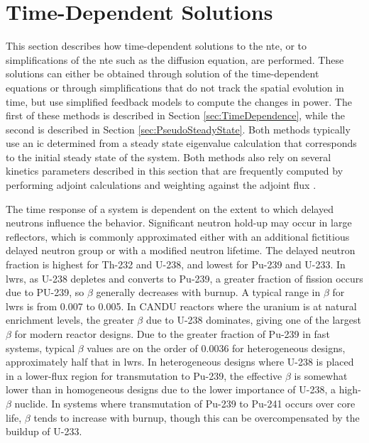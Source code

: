 \section{Time-Dependent Solutions}
\label{sec:Kinetics}

This section describes how time-dependent solutions to the \gls{nte}, or to simplifications of the \gls{nte} such as the diffusion equation, are performed. These solutions can either be obtained through solution of the time-dependent equations or through simplifications that do not track the spatial evolution in time, but use simplified feedback models to compute the changes in power. The first of these methods is described in Section \ref{sec:TimeDependence}, while the second is described in Section \ref{sec:PseudoSteadyState}. Both methods typically use an \gls{ic} determined from a steady state eigenvalue calculation that corresponds to the initial steady state of the system. Both methods also rely on several kinetics parameters described in this section that are frequently computed by performing adjoint calculations and weighting against the adjoint flux \cite{tyobeka}.

The time response of a system is dependent on the extent to which delayed neutrons influence the behavior. Significant neutron hold-up may occur in large reflectors, which is commonly approximated either with an additional fictitious delayed neutron group \cite{xin_wang_thesis} or with a modified neutron lifetime. The delayed neutron fraction is highest for Th-232 and U-238, and lowest for Pu-239 and U-233. In \glspl{lwr}, as U-238 depletes and converts to Pu-239, a greater fraction of fission occurs due to PU-239, so \(\beta\) generally decreases with burnup. A typical range in \(\beta\) for \glspl{lwr} is from 0.007 to 0.005. In CANDU reactors where the uranium is at natural enrichment levels, the greater \(\beta\) due to U-238 dominates, giving one of the largest \(\beta\) for modern reactor designs. Due to the greater fraction of Pu-239 in fast systems, typical \(\beta\) values are on the order of 0.0036 for heterogeneous designs, approximately half that in \glspl{lwr}. In heterogeneous designs where U-238 is placed in a lower-flux region for transmutation to Pu-239, the effective \(\beta\) is somewhat lower than in homogeneous designs due to the lower importance of U-238, a high-\(\beta\) nuclide. In systems where transmutation of Pu-239 to Pu-241 occurs over core life, \(\beta\) tends to increase with burnup, though this can be overcompensated by the buildup of U-233.

